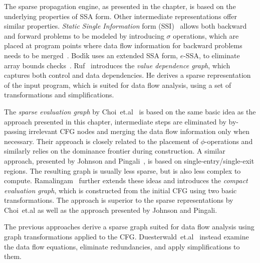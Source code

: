 The sparse propagation engine, as presented in the chapter, is based on the
underlying properties of SSA form. Other intermediate representations offer
similar properties. \emph{Static Single Information} form
(SSI)~\cite{novillo:bib:S05} allows both backward and forward problems to be
modeled by introducing $\sigma$ operations, which are placed at program points
where data flow information for backward problems needs to be
merged~\cite{novillo:bib:S04}. Bod\'{\i}k uses an extended SSA form, $e$-SSA,
to eliminate array bounds checks~\cite{novillo:bib:BGV00}.
Ruf~\cite{novillo:bib:R95} introduces the \emph{value dependence graph}, which
captures both control and data dependencies. He derives a sparse representation
of the input program, which is suited for data flow analysis, using a set of
transformations and simplifications.

The \emph{sparse evaluation graph} by Choi~et.al~\cite{novillo:bib:CCF91} is
based on the same basic idea as the approach presented in this chapter,
intermediate steps are eliminated by by-passing irrelevant CFG nodes and
merging the data flow information only when necessary. Their approach is closely
related to the placement of $\phi$-operations and similarly relies on the
dominance frontier during construction. A similar approach, presented by Johnson
and Pingali~\cite{novillo:bib:JO93}, is based on single-entry/single-exit
regions. The resulting graph is usually less sparse, but is also less complex to
compute. Ramalingam~\cite{novillo:bib:R02} further extends these ideas and
introduces the \emph{compact evaluation graph}, which is constructed from the
initial CFG using two basic transformations. The approach is superior to the
sparse representations by Choi~et.al as well as the approach presented by
Johnson and Pingali.

The previous approaches derive a sparse graph suited for data flow analysis
using graph transformations applied to the CFG.
Duesterwald~et.al~\cite{novillo:bib:DGS94} instead examine the data flow
equations, eliminate redundancies, and apply simplifications to them.

